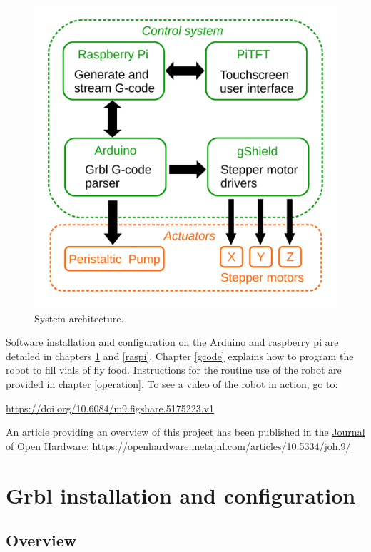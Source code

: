\documentclass[
]{book}
\begin{document}
\begin{figure}

{\centering \includegraphics[width=0.75\linewidth]{images/system_architecture} 

}

\caption{System architecture.}\label{fig:architecture}
\end{figure}

Software installation and configuration on the Arduino and raspberry pi are detailed in chapters \ref{grbl} and \ref{raspi}. Chapter \ref{gcode} explains how to program the robot to fill vials of fly food. Instructions for the routine use of the robot are provided in chapter \ref{operation}. To see a video of the robot in action, go to:

\url{https://doi.org/10.6084/m9.figshare.5175223.v1}

An article providing an overview of this project has been published in the \href{https://openhardware.metajnl.com/}{Journal of Open Hardware}:
\url{https://openhardware.metajnl.com/articles/10.5334/joh.9/}

\hypertarget{grbl}{%
\chapter{Grbl installation and configuration}\label{grbl}}

\hypertarget{overview}{%
\section{Overview}\label{overview}}
\end{document}
